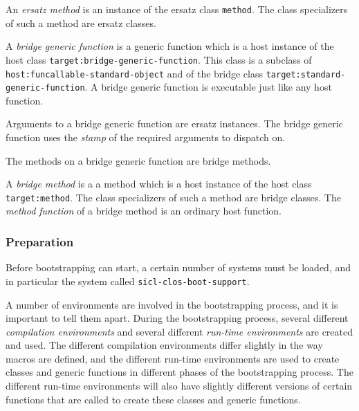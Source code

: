 \begin{definition}
An \emph{ersatz method} is an instance of the ersatz class
\texttt{method}.  The class specializers of such a method are ersatz
classes.
\end{definition}

\begin{definition}
A \emph{bridge generic function} is a generic function which is a host
instance of the host class \texttt{target:bridge-generic-function}.
This class is a subclass of \texttt{host:funcallable-standard-object}
and of the bridge class \texttt{target:standard-generic-function}.
A bridge generic function is executable just like any host function.

Arguments to a bridge generic function are ersatz instances.  The
bridge generic function uses the 
\emph{stamp}
 of
the required arguments to dispatch on. 

The methods on a bridge generic function are bridge methods.
\end{definition}

\begin{definition}
A \emph{bridge method} is a a method which is a host instance of the host
class \texttt{target:method}.  The class specializers of such a method are
bridge classes.  The \emph{method function} of a bridge method is an
ordinary host function.
\end{definition}

\subsubsection{Preparation}

Before bootstrapping can start, a certain number of \asdf{} systems
must be loaded, and in particular the system called
\texttt{sicl-clos-boot-support}.

A number of environments are involved in the bootstrapping process,
and it is important to tell them apart.  During the bootstrapping
process, several different \emph{compilation environments} and several
different \emph{run-time environments} are created and used.  The
different compilation environments differ slightly in the way macros
are defined, and the different run-time environments are used to
create classes and generic functions in different phases of the
bootstrapping process.  The different run-time environments will also
have slightly different versions of certain functions that are called
to create these classes and generic functions.

